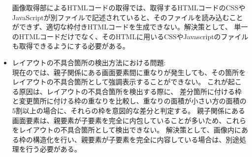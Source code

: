 \begin{itemize}
          画像取得部によるHTMLコードの取得では、取得するHTMLコードのCSSやJavaScriptが別ファイルで記述されていると、そのファイルを読み込むことができず、適切な枠付きHTMLコードを生成できない。解決策として、
          単一のHTMLコードだけでなく、そのHTMLに用いるCSSやJavascriptのファイルも取得できるようにする必要がある。
    \item レイアウトの不具合箇所の検出方法における問題:\\
          現在の\toolName では、親子関係にある画面要素間に重なりが発生しても、その箇所をレイアウトの不具合箇所として強調表示することができない。
          これが起こる原因は、レイアウトの不具合箇所を検出する際に、
          差分箇所に付ける枠と変更箇所に付ける枠の重なりを比較し、重なりの面積が小さい方の面積の5割以上の場合に、それらの枠を意図的な差分と判定する。
          親子関係にある画面要素は、親要素が子要素を完全に内包していることが多いため、これらをレイアウトの不具合箇所として検出できない。
          解決策として、画像内にある枠の構造化を行い、親要素が子要素を完全に内容している場合は、別途処理を行う必要がある。
\end{itemize}
